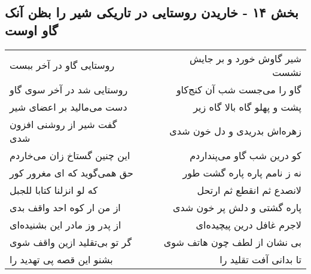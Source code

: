 \begin{center}
\section*{بخش ۱۴ - خاریدن روستایی در تاریکی شیر را بظن آنک گاو اوست}
\label{sec:sh014}
\begin{longtable}{l p{0.5cm} r}
روستایی گاو در آخر ببست
&&
شیر گاوش خورد و بر جایش نشست
\\
روستایی شد در آخر سوی گاو
&&
گاو را می‌جست شب آن کنج‌کاو
\\
دست می‌مالید بر اعضای شیر
&&
پشت و پهلو گاه بالا گاه زیر
\\
گفت شیر از روشنی افزون شدی
&&
زهره‌اش بدریدی و دل خون شدی
\\
این چنین گستاخ زان می‌خاردم
&&
کو درین شب گاو می‌پنداردم
\\
حق همی‌گوید که ای مغرور کور
&&
نه ز نامم پاره پاره گشت طور
\\
که لو انزلنا کتابا للجبل
&&
لانصدع ثم انقطع ثم ارتحل
\\
از من ار کوه احد واقف بدی
&&
پاره گشتی و دلش پر خون شدی
\\
از پدر وز مادر این بشنیده‌ای
&&
لاجرم غافل درین پیچیده‌ای
\\
گر تو بی‌تقلید ازین واقف شوی
&&
بی نشان از لطف چون هاتف شوی
\\
بشنو این قصه پی تهدید را
&&
تا بدانی آفت تقلید را
\\
\end{longtable}
\end{center}
